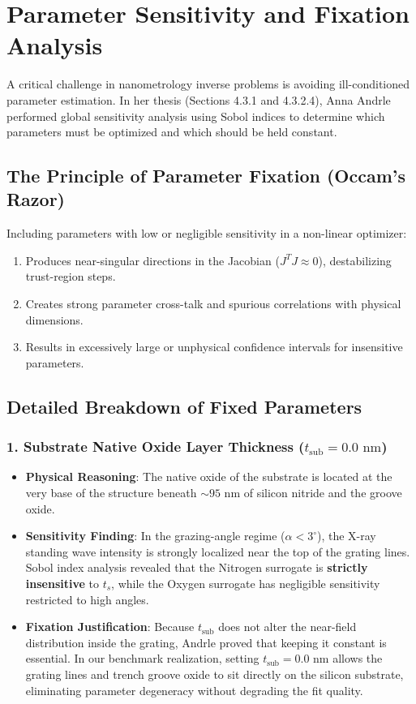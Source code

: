 \documentclass[11pt,a4paper]{article}
\begin{document}
\section{Parameter Sensitivity and Fixation Analysis}

A critical challenge in nanometrology inverse problems is avoiding ill-conditioned parameter estimation. In her thesis (Sections 4.3.1 and 4.3.2.4), Anna Andrle performed global sensitivity analysis using Sobol indices to determine which parameters must be optimized and which should be held constant.

\subsection{The Principle of Parameter Fixation (Occam's Razor)}
Including parameters with low or negligible sensitivity in a non-linear optimizer:
\begin{enumerate}
    \item Produces near-singular directions in the Jacobian ($J^T J \approx 0$), destabilizing trust-region steps.
    \item Creates strong parameter cross-talk and spurious correlations with physical dimensions.
    \item Results in excessively large or unphysical confidence intervals for insensitive parameters.
\end{enumerate}

\subsection{Detailed Breakdown of Fixed Parameters}

\subsubsection{1. Substrate Native Oxide Layer Thickness \texorpdfstring{($t_{\mathrm{sub}} = 0.0\text{ nm}$)}{(t_sub = 0 nm)}}
\begin{itemize}
    \item \textbf{Physical Reasoning}: The native oxide of the substrate is located at the very base of the structure beneath $\sim 95\text{ nm}$ of silicon nitride and the groove oxide.
    \item \textbf{Sensitivity Finding}: In the grazing-angle regime ($\alpha < 3^\circ$), the X-ray standing wave intensity is strongly localized near the top of the grating lines. Sobol index analysis revealed that the Nitrogen surrogate is \textbf{strictly insensitive} to $t_s$, while the Oxygen surrogate has negligible sensitivity restricted to high angles.
    \item \textbf{Fixation Justification}: Because $t_{\mathrm{sub}}$ does not alter the near-field distribution inside the grating, Andrle proved that keeping it constant is essential. In our benchmark realization, setting $t_{\mathrm{sub}} = 0.0\text{ nm}$ allows the grating lines and trench groove oxide to sit directly on the silicon substrate, eliminating parameter degeneracy without degrading the fit quality.
\end{itemize}
\end{document}
